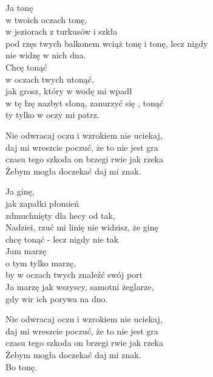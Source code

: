 \begin{text}
    \hfill\break
    Ja tonę\\
    w twoich oczach tonę,\\
    w jeziorach z turkusów i szkła\\
    pod rzęs twych balkonem wciąż tonę i tonę, lecz nigdy\\
    nie widzę w nich dna.\\
    Chcę tonąć\\
    w oczach twych utonąć,\\
    jak grosz, który w wodę mi wpadł\\
    w tę łzę nazbyt słoną, zanurzyć się , tonąć\\
    ty tylko w oczy mi patrz.

    Nie odwracaj oczu i wzrokiem nie uciekaj,\\
    daj mi wreszcie poczuć, że to nie jest gra\\
    czasu tego szkoda on brzegi rwie jak rzeka\\
    Żebym mogła doczekać daj mi znak.

    Ja ginę,\\
    jak zapałki płomień\\
    zdmuchnięty dla hecy od tak,\\
    Nadziei, rzuć mi linię nie widzisz, że ginę\\
    chcę tonąć - lecz nigdy nie tak\\
    Jam marzę\\
    o tym tylko marzę,\\
    by w oczach twych znaleźć swój port\\
    Ja marzę jak wszyscy, samotni żeglarze,\\
    gdy wir ich porywa na dno.

    Nie odwracaj oczu i wzrokiem nie uciekaj,\\
    daj mi wreszcie poczuć, że to nie jest gra\\
    czasu tego szkoda on brzegi rwie jak rzeka\\
    Żebym mogła doczekać daj mi znak.\\
    Bo tonę.
\end{text}

